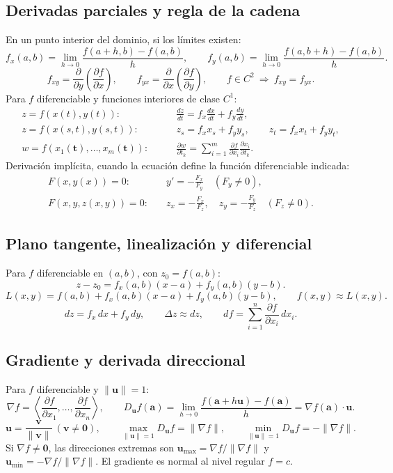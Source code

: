 \subsection*{Derivadas parciales y regla de la cadena}
En un punto interior del dominio, si los límites existen:
\[
f_x(a,b)=\lim_{h\to0}\frac{f(a+h,b)-f(a,b)}h,\qquad
f_y(a,b)=\lim_{h\to0}\frac{f(a,b+h)-f(a,b)}h.
\]
\[
f_{xy}=\frac{\partial}{\partial y}\left(\frac{\partial f}{\partial x}\right),\qquad
f_{yx}=\frac{\partial}{\partial x}\left(\frac{\partial f}{\partial y}\right),\qquad
f\in C^2\ \Longrightarrow\ f_{xy}=f_{yx}.
\]
Para $f$ diferenciable y funciones interiores de clase $C^1$:
\begin{align*}
z=f(x(t),y(t)):&\qquad \frac{dz}{dt}=f_x\frac{dx}{dt}+f_y\frac{dy}{dt},\\
z=f(x(s,t),y(s,t)):&\qquad z_s=f_xx_s+f_yy_s,\qquad z_t=f_xx_t+f_yy_t,\\
w=f(x_1(\mathbf t),\ldots,x_m(\mathbf t)):&\qquad
\frac{\partial w}{\partial t_k}=\sum_{i=1}^m\frac{\partial f}{\partial x_i}\frac{\partial x_i}{\partial t_k}.
\end{align*}
Derivación implícita, cuando la ecuación define la función diferenciable indicada:
\begin{align*}
F(x,y(x))=0:&\quad y'=-\frac{F_x}{F_y}\quad(F_y\ne0),\\
F(x,y,z(x,y))=0:&\quad z_x=-\frac{F_x}{F_z},\quad z_y=-\frac{F_y}{F_z}\quad(F_z\ne0).
\end{align*}

\subsection*{Plano tangente, linealización y diferencial}
Para $f$ diferenciable en $(a,b)$, con $z_0=f(a,b)$:
\[
z-z_0=f_x(a,b)(x-a)+f_y(a,b)(y-b).
\]
\[
L(x,y)=f(a,b)+f_x(a,b)(x-a)+f_y(a,b)(y-b),\qquad f(x,y)\approx L(x,y).
\]
\[
dz=f_x\,dx+f_y\,dy,\qquad \Delta z\approx dz,\qquad
df=\sum_{i=1}^n\frac{\partial f}{\partial x_i}\,dx_i.
\]

\subsection*{Gradiente y derivada direccional}
Para $f$ diferenciable y $\|\mathbf u\|=1$:
\[
\nabla f=\left\langle\frac{\partial f}{\partial x_1},\ldots,
\frac{\partial f}{\partial x_n}\right\rangle,\qquad
D_{\mathbf u}f(\mathbf a)=\lim_{h\to0}\frac{f(\mathbf a+h\mathbf u)-f(\mathbf a)}h
=\nabla f(\mathbf a)\cdot\mathbf u.
\]
\[
\mathbf u=\frac{\mathbf v}{\|\mathbf v\|}\ (\mathbf v\ne\mathbf0),\qquad
\max_{\|\mathbf u\|=1}D_{\mathbf u}f=\|\nabla f\|,\qquad
\min_{\|\mathbf u\|=1}D_{\mathbf u}f=-\|\nabla f\|.
\]
Si $\nabla f\ne\mathbf0$, las direcciones extremas son
$\mathbf u_{\max}=\nabla f/\|\nabla f\|$ y
$\mathbf u_{\min}=-\nabla f/\|\nabla f\|$.
El gradiente es normal al nivel regular $f=c$.

